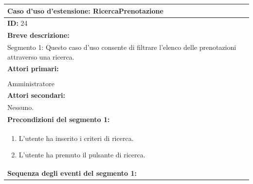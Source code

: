 \documentclass{article}
\begin{document}
                \begin{table}[H]
                    \begin{tabular}{|p{\linewidth}|}
                        \hline
                        \cellcolor{gray!100}
                        \color{white}
                        \centerline{\textbf{Caso d'uso d'estensione:} RicercaPrenotazione} \\
                        \hline
                        \textbf{ID:} 24 \\
                        \hline
                        \cellcolor{gray!20}
                        \textbf{Breve descrizione:} \\
                        \cellcolor{gray!20}
                        Segmento 1: Questo caso d'uso consente di filtrare l'elenco delle prenotazioni attraverso una ricerca. \\
                        \hline
                        \textbf{Attori primari:} \\
                        \begin{minipage}{\linewidth}
                            Biglietteria \\
                            Amministratore
                        \end{minipage}
                        \vspace{-5pt} \\
                        \hline
                        \textbf{Attori secondari:} \\
                        Nessuno. \\
                        \hline
                        \cellcolor{gray!20}
                        \textbf{Precondizioni del segmento 1:} \\
                        \cellcolor{gray!20}
                        \begin{minipage}{\linewidth}
                            \begin{enumerate}
                                \item L'utente ha inserito i criteri di ricerca.
                                \item L'utente ha premuto il pulsante di ricerca.
                            \end{enumerate}
                        \end{minipage} \\
                        \hline
                        \textbf{Sequenza degli eventi del segmento 1:}

\end{tabular}
\end{table}
\end{document}
